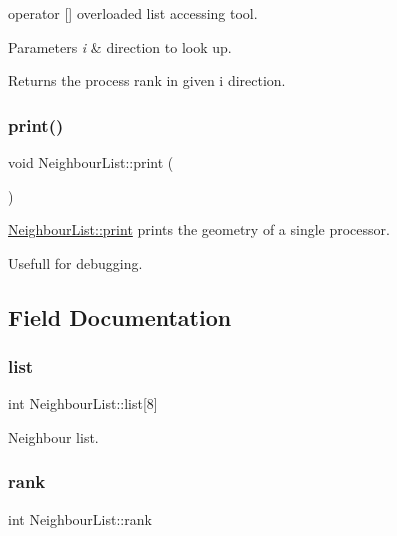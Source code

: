 operator \mbox{[}\mbox{]} overloaded list accessing tool. 


\begin{DoxyParams}{Parameters}
{\em i} & direction to look up. \\
\hline
\end{DoxyParams}
\begin{DoxyReturn}{Returns}
the process rank in given i direction. 
\end{DoxyReturn}
\mbox{\label{struct_neighbour_list_a9e8123deded59c4c702429fda52af140}} 
\subsubsection{\texorpdfstring{print()}{print()}}
{\footnotesize\ttfamily void Neighbour\+List\+::print (\begin{DoxyParamCaption}{ }\end{DoxyParamCaption})}



\mbox{\hyperlink{struct_neighbour_list_a9e8123deded59c4c702429fda52af140}{Neighbour\+List\+::print}} prints the geometry of a single processor. 

Usefull for debugging. 

\subsection{Field Documentation}
\mbox{\label{struct_neighbour_list_ad55e922aabd4ef75711d22c5e5634165}} 
\subsubsection{\texorpdfstring{list}{list}}
{\footnotesize\ttfamily int Neighbour\+List\+::list\mbox{[}8\mbox{]}}



Neighbour list. 

\mbox{\label{struct_neighbour_list_abe10231f4cd3e607e19cea0b0d7aab03}} 
\subsubsection{\texorpdfstring{rank}{rank}}
{\footnotesize\ttfamily int Neighbour\+List\+::rank}



